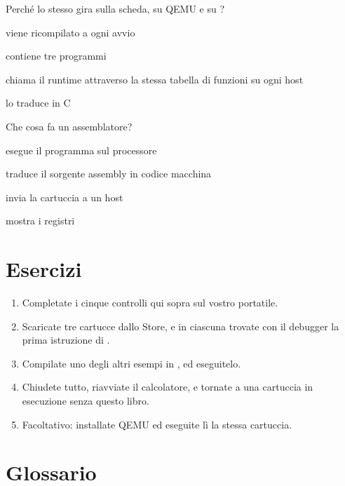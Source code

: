 \begin{quiz}{Perché lo stesso  gira sulla scheda, su QEMU e su \prgqt?}
\item viene ricompilato a ogni avvio
\item contiene tre programmi
\item chiama il runtime attraverso la stessa tabella di funzioni su ogni host
\item \prgqt lo traduce in C
\end{quiz}

\begin{quiz}{Che cosa fa un assemblatore?}
\item esegue il programma sul processore
\item traduce il sorgente assembly in codice macchina
\item invia la cartuccia a un host
\item mostra i registri
\end{quiz}

\section{Esercizi}

\begin{exercise}
\begin{enumerate}[nosep]
\item Completate i cinque controlli qui sopra sul vostro portatile.
\item Scaricate tre cartucce dallo Store, e in ciascuna trovate con il debugger
  la prima istruzione di .
\item Compilate uno degli altri esempi in , ed
  eseguitelo.
\item Chiudete tutto, riavviate il calcolatore, e tornate a una cartuccia in
  esecuzione senza questo libro.
\item Facoltativo: installate QEMU ed eseguite lì la stessa cartuccia.
\end{enumerate}
\end{exercise}

\section{Glossario}

